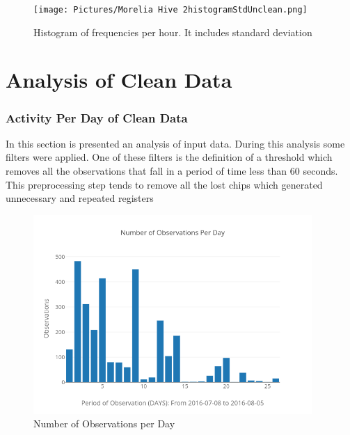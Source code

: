 \documentclass[11pt,fleqn]{book} %
\begin{document}
%


\begin{figure}[h!]%
\centering%
\texttt{[image: Pictures/Morelia Hive 2histogramStdUnclean.png]}%
\caption{Histogram of frequencies per hour. It includes standard deviation}%
\end{figure}

\chapter{Analysis of Clean Data}
\normalsize%
\subsection{Activity Per Day of Clean Data}%
\label{subsec:Activity Per Day of Clean Data}%
In this section is presented an analysis of input data. During this analysis some filters were applied. One of these filters is the definition of a threshold which removes all the observations that fall in a period of time less than 60 seconds. This preprocessing step tends to  remove all the lost chips which generated unnecessary and repeated registers %


\begin{figure}[h!]%
\centering%
\includegraphics[width=400px]{Pictures/Morelia Hive 2observationsPerdayClean.png}%
\caption{Number of Observations per Day}%
\end{figure}
\end{document}
